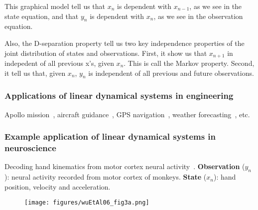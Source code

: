 \begin{frame}
{            This graphical model tell us that $x_n$ is dependent with
            $x_{n-1}$, as we see in the state equation, and that $y_n$ is
            dependent with $x_n$, as we see in the observation equation.

            Also, the D-separation property tell us two key independence
            properties of the joint distribution of states and observations.
            First, it show us that $x_{n+1}$ in indepedent of all previous x's,
            given $x_n$. This is call the Markov property. Second, it tell us
            that, given $x_n$, $y_n$ is independent of all previous and future
            observations.

            \normalsize
        }

\end{frame}

\begin{frame}
    \frametitle{Applications of linear dynamical systems in engineering}

    Apollo mission~\citep{mcGeeAndSchmidt85}, aircraft
    guidance~\citep{schmidtEtAl70}, GPS
    navigation~\citep{hofmannAndLichtenegger97}, weather
    forecasting~\citep{buehnerEtAl17}, etc.

    \vspace{.1in}


    \note[itemize] {
        \scriptsize

        \item 

    }

\end{frame}

\begin{frame}
    \frametitle{Example application of linear dynamical systems in neuroscience}

    Decoding hand kinematics from motor cortex neural
    activity~\citep{wuEtAl06}.
%
    \textbf{Observation} ($y_n$): neural activity recorded from motor cortex of
    monkeys.
%
    \textbf{State} ($x_n$): hand position, velocity and acceleration.

    \begin{figure}[h]
        \begin{center}
            \texttt{[image: figures/wuEtAl06\_fig3a.png]}
        \end{center}
    \end{figure}
    \hfill\citet{wuEtAl06}

\end{frame}

